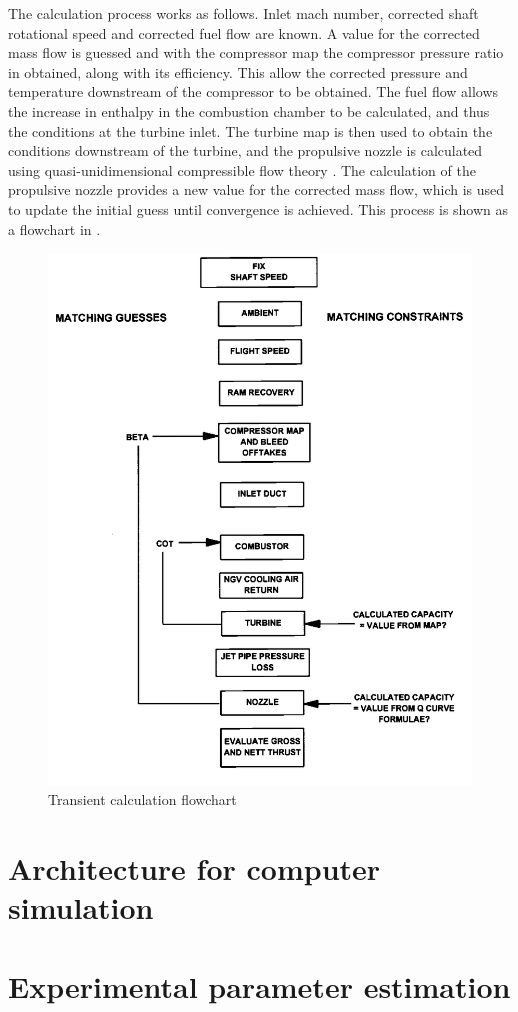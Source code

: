 The calculation process works as follows.
Inlet mach number, corrected shaft rotational speed and corrected fuel flow are known.
A value for the corrected mass flow is guessed and with the compressor map the compressor pressure ratio in obtained, along with its efficiency.
This allow the corrected pressure and temperature downstream of the compressor to be obtained.
The fuel flow allows the increase in enthalpy in the combustion chamber to be calculated, and thus the conditions at the turbine inlet.
The turbine map is then used to obtain the conditions downstream of the turbine, and the propulsive nozzle is calculated using quasi-unidimensional compressible flow theory \cite{anderson}.
The calculation of the propulsive nozzle provides a new value for the corrected mass flow, which is used to update the initial guess until 
 convergence is achieved.
This process is shown as a flowchart in .

\begin{figure}
    \centering
    \caption{Transient calculation flowchart}
    \label{fig:transient_calculation}
    \includegraphics[width=\textwidth]{fig/transient_calculation_flowchart.png}
\end{figure}

\section{Architecture for computer simulation}
\section{Experimental parameter estimation}

